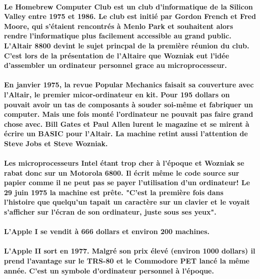 \paragraph{
  Le Homebrew Computer Club est un club d'informatique de la Silicon Valley entre 1975 et 1986. Le club est initié par Gordon French et Fred Moore, qui s’étaient rencontrés à Menlo Park et souhaitent alors rendre l’informatique plus facilement accessible au grand public. L'Altair 8800 devint le sujet princpal de la première réunion du club. C'est lors de la présentation de l'Altaire que Wozniak eut l'idée d'assembler un ordinateur personnel grace au microprocesseur.
}

\paragraph{
  En janvier 1975, la revue Popular Mechanics faisait sa couverture avec l'Altair, le premier micor-ordinateur en kit. Pour 195 dollars on pouvait avoir un tas de composants à souder soi-même et fabriquer un computer. Mais une fois monté l'ordinateur ne pouvait pas faire grand chose avec. Bill Gates et Paul Allen lurent le magazine et se mirent à écrire un BASIC pour l'Altair. La machine retint aussi l'attention de Steve Jobs et Steve Wozniak.
}

\paragraph{
  Les microprocesseurs Intel étant trop cher à l'époque et Wozniak se rabat donc sur un Motorola 6800. Il écrit même le code source sur papier comme il ne peut pas se payer l'utilisation d'un ordinateur! Le 29 juin 1975 la machine est prête. "C'est la première fois dans l'histoire que quelqu'un tapait un caractère sur un clavier et le voyait s'afficher sur l'écran de son ordinateur, juste sous ses yeux".
}

\paragraph{
  L'Apple I se vendit à 666 dollars et environ 200 machines.
}

\paragraph{
  L'Apple II sort en 1977. Malgré son prix élevé (environ 1000 dollars) il prend l'avantage sur le TRS-80 et le Commodore PET lancé la même année. C'est un symbole d'ordinateur personnel à l'époque.
}

